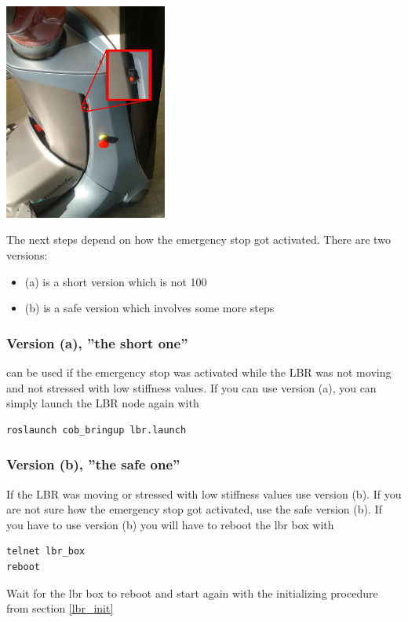 \begin{center}
 \includegraphics[width=0.4\textwidth]{images/lbr_em.jpg}\label{lbr_em}
\end{center}

The next steps depend on how the emergency stop got activated. There are two versions:
\begin{itemize}
\item (a) is a short version which is not 100%
\item (b) is a safe version which involves some more steps
\end{itemize}

\subsubsection{Version (a), ”the short one”} can be used if the emergency stop was activated while the LBR was not moving and not stressed with low stiffness values. If you can use version (a), you can simply launch the LBR node again with
\begin{lstlisting}
roslaunch cob_bringup lbr.launch
\end{lstlisting}

\subsubsection{Version (b), ”the safe one”}
If the LBR was moving or stressed with low stiffness values use version (b). If you are not sure how the emergency stop got activated, use the safe version (b). If you have to use version (b) you will have to reboot the lbr box with
\begin{lstlisting}
telnet lbr_box
reboot
\end{lstlisting}

Wait for the lbr box to reboot and start again with the initializing procedure from section \ref{lbr_init}

